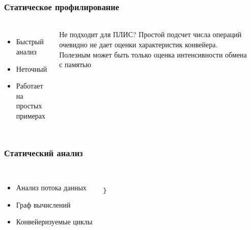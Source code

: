 \documentclass{beamer}              %
\begin{document}
\begin{frame}[fragile]
\frametitle{Статическое профилирование}
  \framesubtitle{}
  \begin{columns}
        \begin{itemize}
            \item Быстрый анализ 
            \item Неточный
            \item Работает на простых примерах
        \end{itemize}      

    \begin{block}{Не подходит для ПЛИС?}
         Простой подсчет числа операций очевидно не дает оценки характеристик конвейера.
         Полезным может быть только оценка интенсивности обмена с памятью
      \end{block}
    \label{encode_listing}
      
\end{columns}
  
\end{frame}

\begin{frame}[fragile]
\frametitle{Статический анализ}
  \framesubtitle{}
  \begin{columns}
        \begin{itemize}
            \item Анализ потока данных
            \item Граф вычислений
            \item Конвейеризуемые циклы
        \end{itemize}      

 
      
\begin{lstlisting}[frame=single]

}
\end{lstlisting}
\label{encode_listing}
      
  \end{columns}
  
\end{frame}
\end{document}
